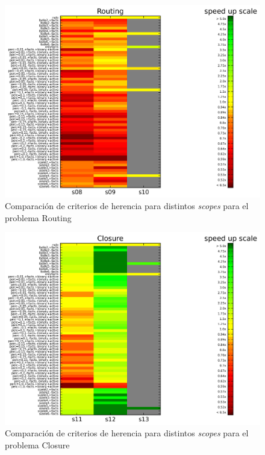 \begin{figure}
	\includegraphics[width=\textwidth]{resultados/losp_heat.png}
	\caption{Comparación de criterios de herencia para distintos \emph{scopes} para el problema Routing}
	\label{res:learnscopespamela}
\end{figure}

\begin{figure}
	\includegraphics[width=\textwidth]{resultados/losk_heat.png}
	\caption{Comparación de criterios de herencia para distintos \emph{scopes} para el problema Closure}
	\label{res:learnscopesclosure}
\end{figure}

